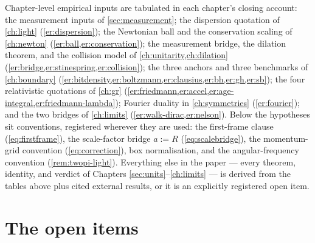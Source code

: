 \documentclass[11pt]{amsbook}
\theoremstyle{plain}
\theoremstyle{definition}
\theoremstyle{remark}
\begin{document}
Chapter-level empirical inputs are tabulated in each chapter's closing account: the measurement inputs of \cref{sec:measurement}; the dispersion quotation of \cref{ch:light} (\cref{er:dispersion}); the Newtonian ball and the conservation scaling of \cref{ch:newton} (\cref{er:ball,er:conservation}); the measurement bridge, the dilation theorem, and the collision model of \cref{ch:unitarity,ch:dilation} (\cref{er:bridge,er:stinespring,er:collision}); the three anchors and three benchmarks of \cref{ch:boundary} (\cref{er:bitdensity,er:boltzmann,er:clausius,er:bh,er:gh,er:sb}); the four relativistic quotations of \cref{ch:gr} (\cref{er:friedmann,er:accel,er:age-integral,er:friedmann-lambda}); Fourier duality in \cref{ch:symmetries} (\cref{er:fourier}); and the two bridges of \cref{ch:limits} (\cref{er:walk-dirac,er:nelson}). Below the hypotheses sit conventions, registered wherever they are used: the first-frame clause (\cref{eq:firstframe}), the scale-factor bridge $a := R$ (\cref{eq:scalebridge}), the momentum-grid convention (\cref{eq:correction}), box normalisation, and the angular-frequency convention (\cref{rem:twopi-light}). Everything else in the paper --- every theorem, identity, and verdict of Chapters \ref{sec:units}--\ref{ch:limits} --- is derived from the tables above plus cited external results, or it is an explicitly registered open item.

\section{The open items}\label{sec:open-registry}
\end{document}
